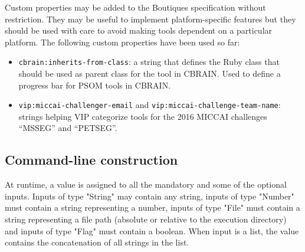 \documentclass{article}
\begin{document}
Custom properties may be added to the Boutiques specification without
restriction. They may be useful to implement platform-specific
features but they should be used with care to avoid making tools
dependent on a particular platform. The following custom properties
have been used so far:
\begin{itemize}
\item \texttt{cbrain:inherits-from-class}: a string that defines the
  Ruby class that should be used as parent class for the tool in
  CBRAIN. Used to define a progress bar for PSOM tools in CBRAIN.
\item \texttt{vip:miccai-challenger-email} and
  \texttt{vip:miccai-challenge-team-name}: strings helping VIP
  categorize tools for the 2016 MICCAI challenges ``MSSEG'' and
  ``PETSEG''.
\end{itemize}

\subsection{Command-line construction}

At runtime, a value is assigned to all the mandatory and some of the
optional inputs. Inputs of type "String" may contain any string,
inputs of type "Number" must contain a string representing a number,
inputs of type "File" must contain a string representing a file path
(absolute or relative to the execution directory) and inputs of type
"Flag" must contain a boolean. When input is a list, the value
contains the concatenation of all strings in the list.
\end{document}
